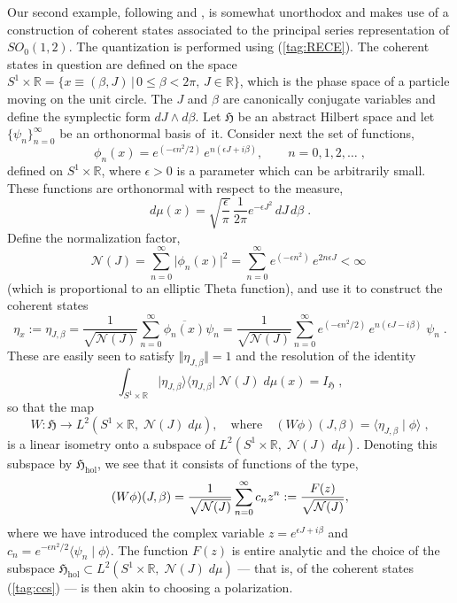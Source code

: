 \documentclass[11pt]{amsart}
\numberwithin{equation}{section}
\theoremstyle{remark}
\newcommand\HH{\mathfrak H}
\newcommand{\R}{\mathbb R}
\begin{document}
\medskip

Our second example, following \cite{bib:Gaz} and \cite{bib:GazP}, is somewhat
unorthodox and makes use of a construction of coherent states associated to the
principal series representation of $SO_0(1,2)$. The quantization is performed
using (\ref{tag:RECE}). The coherent states in question are defined on the
space $S^1 \times \mathbb R = \{ x \equiv (\beta,J) \, | \, 0 \leq \beta < 2\pi
, \, J \in \R \}$, which is the phase space of a particle moving on the unit
circle. The $J$ and $\beta$ are canonically conjugate variables and define the
symplectic form $dJ\wedge d\beta$. Let $\HH$ be an abstract Hilbert space and
let $\{\psi_n\}_{n=0}^\infty$ be an orthonormal basis of~it. Consider next the
set of functions,
\begin{equation}
  \phi_n (x) = e^{(-\epsilon n^2/2)} \,e^{n(\epsilon J +  i \beta)},
  \qquad n = 0,1,2, \ldots \;,
\label{tag:CS-fcns}
\end{equation}
defined on $S^1 \times \mathbb R$, where $\epsilon > 0$ is a parameter which
can be arbitrarily small. These functions are orthonormal with respect to the
measure,
$$
d\mu(x) = \sqrt{\frac{\epsilon}{\pi}}\,\frac{1}{2\pi}
e^{-\epsilon J^2} \, dJ\, d\beta \; .
$$
Define the normalization factor,
\begin{equation}
 \mathcal{N}(J) = \sum_{n=0}^\infty \vert\phi_n (x)\vert^2 =
\sum_{n=0}^\infty e^{(-\epsilon n^2)} \,e^{2n\epsilon J } < \infty\;
\label{tag:norci}
\end{equation}
(which is proportional to an elliptic Theta function), and use it to construct
the coherent states
\begin{equation}
\eta_x := \eta_{J, \beta} = \frac{1}{\sqrt{{\mathcal N} (J)}} \sum_{n=0}^\infty
    \overline{\phi_n (x)}\psi_n
 = \frac{1}{\sqrt{{\mathcal N} (J)}} \sum_{n=0}^\infty
    e^{(-\epsilon n^2/2)} \,e^{n(\epsilon J - i \beta)}\; \psi_n\; .
\label{tag:ccs}
\end{equation}
These are easily seen to satisfy $\Vert \eta_{J, \beta}\Vert = 1$ and the
resolution of the identity
\begin{equation}
 \int_{S^1\times \mathbb R}\vert \eta_{J,\beta} \rangle
 \langle \eta_{J, \beta} \vert\;
 \mathcal{N}(J)\;d\mu (x) = I_\HH \; ,
\label{tag:cylresolid}
\end{equation}
so that the map
$$ W:\HH \longrightarrow L^2 (S^1 \times \mathbb R , \; \mathcal N(J)\;d\mu ),
\quad \text{where} \quad
 (W\phi )(J, \beta ) = \langle \eta_{J,\beta} \mid \phi\rangle  \; , $$
is a linear isometry onto a subspace of $L^2 (S^1 \times \mathbb R , \;
\mathcal N (J) \;d\mu )$. Denoting this subspace by
$\HH_\text{hol}$, we see that it consists of functions of the type,
$$ (W\phi )(J, \beta ) = \frac1{\sqrt{\mathcal N(J)}} \sum_{n=0}^\infty c_n z^n
:= \frac{F(z)}{\sqrt{\mathcal N(J)}} , $$
where we have introduced the complex variable $z = e^{\epsilon J + i \beta}$
and $c_n = e^{-\epsilon n^2 /2}\langle \psi_n \mid \phi \rangle$. The function
$F(z)$ is entire analytic and the choice of the subspace $\HH_\text{hol}
\subset L^2 (S^1 \times \mathbb R , \; \mathcal N (J) \;d\mu )$ --- that is,
of the coherent states (\ref{tag:ccs}) --- is then akin to choosing a
polarization.
\end{document}

